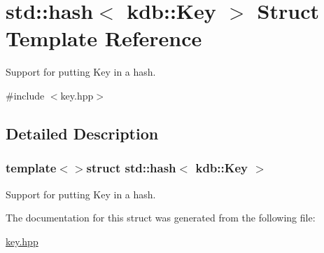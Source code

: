 \hypertarget{structstd_1_1hash_3_01kdb_1_1Key_01_4}{\section{std\+:\+:hash$<$ kdb\+:\+:Key $>$ Struct Template Reference}
\label{structstd_1_1hash_3_01kdb_1_1Key_01_4}
}


Support for putting Key in a hash.  




{\ttfamily \#include $<$key.\+hpp$>$}



\subsection{Detailed Description}
\subsubsection*{template$<$$>$struct std\+::hash$<$ kdb\+::\+Key $>$}

Support for putting Key in a hash. 

The documentation for this struct was generated from the following file\+:\begin{DoxyCompactItemize}
\item 
\hyperlink{key_8hpp}{key.\+hpp}\end{DoxyCompactItemize}
